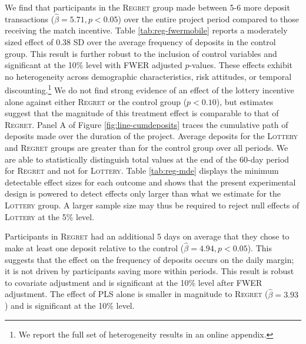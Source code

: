 \documentclass[12pt]{article}
\begin{document}
		

		We find that participants in the \textsc{Regret} group made between 5-6 more deposit transactions ($\hat \beta = 5.71, p < 0.05$) over the entire project period compared to those receiving the match incentive. Table \ref{tab:reg-fwermobile} reports a moderately sized effect of 0.38 SD over the average frequency of deposits in the control group. This result is further robust to the inclusion of control variables and significant at the 10\% level with FWER adjusted $p$-values. These effects exhibit no heterogeneity across demographic characteristics, risk attitudes, or temporal discounting.\footnote{We report the full set of heterogeneity results in an online appendix.} We do not find strong evidence of an effect of the lottery incentive alone against either \textsc{Regret} or the control group ($p < 0.10$), but estimates suggest that the magnitude of this treatment effect is comparable to that of \textsc{Regret}. Panel A of Figure \ref{fig:line-cumdeposits} traces the cumulative path of deposits made over the duration of the project. Average deposits for the \textsc{Lottery} and \textsc{Regret} groups are greater than for the control group over all periods. We are able to statistically distinguish total values at the end of the 60-day period for \textsc{Regret} and not for \textsc{Lottery}. Table \ref{tab:reg-mde} displays the minimum detectable effect sizes for each outcome and shows that the present experimental design is powered to detect effects only larger than what we estimate for the \textsc{Lottery} group. A larger sample size may thus be required to reject null effects of \textsc{Lottery} at the 5\% level.

		

		Participants in \textsc{Regret} had an additional 5 days on average that they chose to make at least one deposit relative to the control ($\hat \beta = 4.94, p < 0.05$). This suggests that the effect on the frequency of deposits occurs on the daily margin; it is not driven by participants saving more within periods. This result is robust to covariate adjustment and is significant at the 10\% level after FWER adjustment. The effect of PLS alone is smaller in magnitude to \textsc{Regret} ($\hat \beta = 3.93$) and is significant at the 10\% level.
\end{document}
